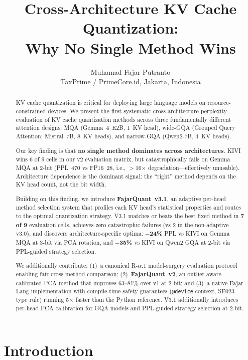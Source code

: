\documentclass[10pt,twocolumn]{article}
\title{Cross-Architecture KV Cache Quantization:\\Why No Single Method Wins}
\author{Muhamad Fajar Putranto\\TaxPrime / PrimeCore.id, Jakarta, Indonesia}
\date{}
\begin{document}
\maketitle

\begin{abstract}
KV cache quantization is critical for deploying large language models on
resource-constrained devices. We present the first systematic
cross-architecture perplexity evaluation of KV cache quantization
methods across three fundamentally different attention designs: MQA
(Gemma~4~E2B, 1~KV head), wide-GQA (Grouped Query Attention;
Mistral~7B, 8~KV heads), and narrow-GQA (Qwen2-7B, 4~KV heads).

Our key finding is that \textbf{no single method dominates across
architectures}. KIVI wins 6 of 9 cells in our v2 evaluation matrix, but
catastrophically fails on Gemma MQA at 2-bit (PPL~470 vs FP16~28,
i.e., $>$16$\times$ degradation---effectively unusable).
Architecture dependence is the dominant signal: the ``right'' method
depends on the KV head count, not the bit width.

Building on this finding, we introduce \textbf{FajarQuant~v3.1}, an
adaptive per-head method selection system that profiles each KV head's
statistical properties and routes to the optimal quantization strategy.
V3.1 matches or beats the best fixed method in \textbf{7 of 9} evaluation
cells, achieves zero catastrophic failures (vs 2 in the non-adaptive
v3.0), and discovers architecture-specific optima: \textbf{$-$24\%}
PPL vs KIVI on Gemma MQA at 3-bit via PCA rotation, and
\textbf{$-$35\%} vs KIVI on Qwen2 GQA at 2-bit via PPL-guided strategy
selection.

We additionally contribute: (1)~a canonical R-$\alpha$.1 model-surgery
evaluation protocol enabling fair cross-method comparison;
(2)~\textbf{FajarQuant~v2}, an outlier-aware calibrated PCA method that
improves 63--81\% over v1 at 2-bit; and (3)~a native Fajar Lang
implementation with compile-time safety guarantees (\texttt{@device}
context, SE023 type rule) running 5$\times$ faster than the Python
reference. V3.1 additionally introduces per-head PCA calibration for
GQA models and PPL-guided strategy selection at 2-bit.
\end{abstract}

\section{Introduction}
\end{document}
